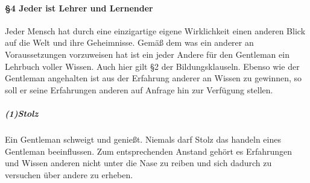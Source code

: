 \paragraph{§4 Jeder ist Lehrer und Lernender}
Jeder Mensch hat durch eine einzigartige eigene Wirklichkeit einen anderen Blick auf die Welt und ihre Geheimnisse. Gemäß dem was ein anderer an Voraussetzungen vorzuweisen hat ist ein jeder Andere für den Gentleman ein Lehrbuch voller Wissen. Auch hier gilt §2 der Bildungsklauseln. Ebenso wie der Gentleman angehalten ist aus der Erfahrung anderer an Wissen zu gewinnen, so soll er seine Erfahrungen anderen auf Anfrage hin zur Verfügung stellen.

\subparagraph{(1)Stolz}
Ein Gentleman schweigt und genießt. Niemals darf Stolz das handeln eines Gentleman beeinflussen. Zum entsprechenden Anstand gehört es Erfahrungen und Wissen anderen nicht unter die Nase zu reiben und sich dadurch zu versuchen über andere zu erheben.
